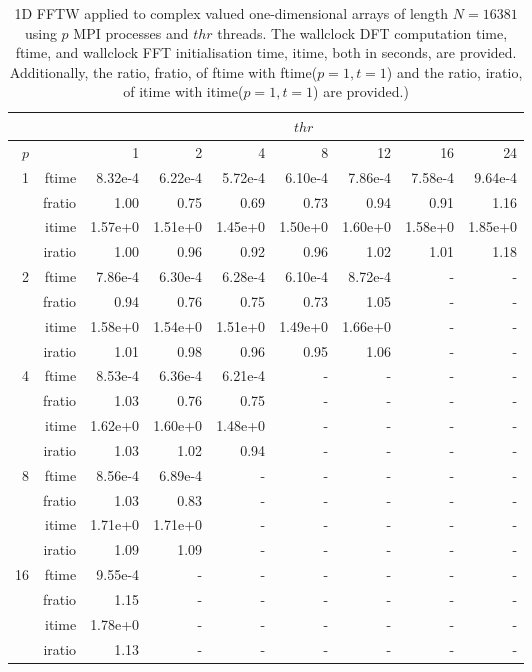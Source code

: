 \documentclass[a4paper]{article}
\begin{document}
\begin{table}[htbp]
\begin{center}
\begin{small}
\begin{tabular}{|r|r|r|r|r|r|r|r|r|}
\hline 
     &  & \multicolumn{7}{c|}{$thr$} \\ \hline
    $p$  &  & 1           & 2    & 4    & 8    & 12   & 16    & 24  \\ \hline\hline
   1 &  ftime &   8.32e-4 &   6.22e-4 &   5.72e-4 &   6.10e-4 &   7.86e-4 &   7.58e-4 &   9.64e-4 \\
   &  fratio &   1.00 &   0.75 &   0.69 &   0.73 &   0.94 &   0.91 &   1.16 \\
   &  itime &   1.57e+0 &   1.51e+0 &   1.45e+0 &   1.50e+0 &   1.60e+0 &   1.58e+0 &   1.85e+0 \\
   &  iratio &   1.00 &   0.96 &   0.92 &   0.96 &   1.02 &   1.01 &   1.18 \\\hline
   2 &  ftime &   7.86e-4 &   6.30e-4 &   6.28e-4 &   6.10e-4 &   8.72e-4 &  - &  - \\
   &  fratio &   0.94 &   0.76 &   0.75 &   0.73 &   1.05 &  - &  - \\
   &  itime &   1.58e+0 &   1.54e+0 &   1.51e+0 &   1.49e+0 &   1.66e+0 &  - &  - \\
   &  iratio &   1.01 &   0.98 &   0.96 &   0.95 &   1.06 &  - &  - \\\hline
   4 &  ftime &   8.53e-4 &   6.36e-4 &   6.21e-4 &  - &  - &  - &  - \\
   &  fratio &   1.03 &   0.76 &   0.75 &  - &  - &  - &  - \\
   &  itime &   1.62e+0 &   1.60e+0 &   1.48e+0 &  - &  - &  - &  - \\
   &  iratio &   1.03 &   1.02 &   0.94 &  - &  - &  - &  - \\\hline
   8 &  ftime &   8.56e-4 &   6.89e-4 &  - &  - &  - &  - &  -\\ 
   &  fratio &   1.03 &   0.83 &  - &  - &  - &  - &  - \\
   &  itime &   1.71e+0 &   1.71e+0 &  - &  - &  - &  - &  - \\
   &  iratio &   1.09 &   1.09 &  - &  - &  - &  - &  - \\\hline
   16 &  ftime &   9.55e-4 &  - &  - &  - &  - &  - &  - \\
   &  fratio &   1.15 &  - &  - &  - &  - &  - &  - \\
   &  itime &   1.78e+0 &  - &  - &  - &  - &  - &  - \\
   &  iratio &   1.13 &  - &  - &  - &  - &  - &  - \\\hline
   \end{tabular}
\caption{1D FFTW applied to complex valued one-dimensional arrays of length $N=16381$ using $p$ MPI processes and $thr$ threads. The wallclock DFT computation time, ftime, and wallclock FFT initialisation time, itime, both in seconds, are provided. Additionally, the ratio, fratio, of ftime  with ftime($p=1,t=1$) and the ratio, iratio, of itime  with itime($p=1,t=1$) are provided.) }\label{Tbl:FFT1d16381}
\end{small}
\end{center}
\end{table}
\end{document}
